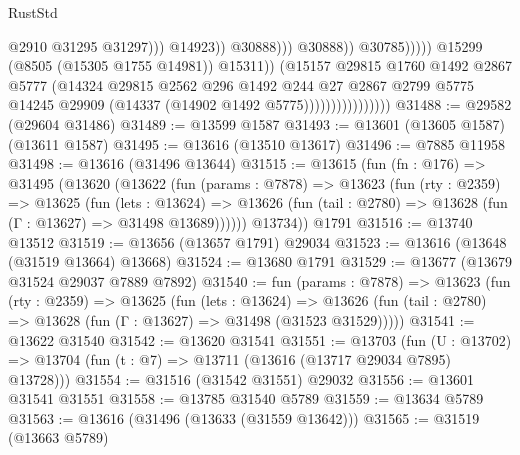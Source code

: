 \begin{lexlean}{RustStd}
\begin{coremodule}
                                                              @2910
                                                              @31295
                                                              @31297)))
                                                        @14923))
                                                    @30888)))
                                              @30888))
                                          @30785)))))
                                @15299
                                (@8505 (@15305 @1755 @14981))
                                @15311))
                            (@15157
                              @29815
                              @1760
                              @1492
                              @2867
                              @5777
                              (@14324
                                @29815
                                @2562
                                @296
                                @1492
                                @244
                                @27
                                @2867
                                @2799
                                @5775
                                @14245
                                @29909
                                (@14337 (@14902 @1492 @5775))))))))))))))))
@31488 := @29582 (@29604 @31486)
@31489 := @13599 @1587
@31493 := @13601 (@13605 @1587) (@13611 @1587)
@31495 := @13616 (@13510 @13617)
@31496 := @7885 @11958
@31498 := @13616 (@31496 @13644)
@31515 := @13615
    (fun (fn : @176) =>
    @31495
      (@13620
        (@13622
          (fun (params : @7878) =>
          @13623
            (fun (rty : @2359) =>
            @13625
              (fun (lets : @13624) =>
              @13626 (fun (tail : @2780) => @13628 (fun (Γ : @13627) => @31498 @13689))))))
        @13734))
    @1791
@31516 := @13740 @13512
@31519 := @13656 (@13657 @1791) @29034
@31523 := @13616 (@13648 (@31519 @13664) @13668)
@31524 := @13680 @1791
@31529 := @13677 (@13679 @31524 @29037 @7889 @7892)
@31540 := fun (params : @7878) =>
  @13623
    (fun (rty : @2359) =>
    @13625
      (fun (lets : @13624) =>
      @13626 (fun (tail : @2780) => @13628 (fun (Γ : @13627) => @31498 (@31523 @31529)))))
@31541 := @13622 @31540
@31542 := @13620 @31541
@31551 := @13703
    (fun (U : @13702) => @13704 (fun (t : @7) => @13711 (@13616 (@13717 @29034 @7895) @13728)))
@31554 := @31516 (@31542 @31551) @29032
@31556 := @13601 @31541 @31551
@31558 := @13785 @31540 @5789
@31559 := @13634 @5789
@31563 := @13616 (@31496 (@13633 (@31559 @13642)))
@31565 := @31519 (@13663 @5789)

\end{coremodule}
\end{lexlean}
